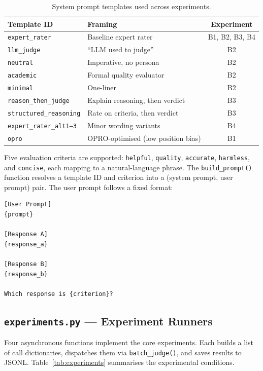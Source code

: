 \documentclass[11pt,a4paper]{article}
\begin{document}
\begin{table}[htbp]
\centering
\small
\caption{System prompt templates used across experiments.}
\label{tab:templates}
\begin{tabular}{@{}llc@{}}
  \toprule
  \textbf{Template ID} & \textbf{Framing} & \textbf{Experiment} \\
  \midrule
  \texttt{expert\_rater}  & Baseline expert rater   & B1, B2, B3, B4 \\
  \texttt{llm\_judge}     & ``LLM used to judge''   & B2 \\
  \texttt{neutral}        & Imperative, no persona  & B2 \\
  \texttt{academic}       & Formal quality evaluator & B2 \\
  \texttt{minimal}        & One-liner               & B2 \\
  \texttt{reason\_then\_judge} & Explain reasoning, then verdict & B3 \\
  \texttt{structured\_reasoning} & Rate on criteria, then verdict & B3 \\
  \texttt{expert\_rater\_alt1--3} & Minor wording variants & B4 \\
  \texttt{opro} & OPRO-optimised (low position bias) & B1 \\
  \bottomrule
\end{tabular}
\end{table}

Five evaluation criteria are supported: \texttt{helpful}, \texttt{quality},
\texttt{accurate}, \texttt{harmless}, and \texttt{concise}, each mapping to
a natural-language phrase. The \texttt{build\_prompt()} function resolves a
template ID and criterion into a (system prompt, user prompt) pair. The user
prompt follows a fixed format:

\begin{lstlisting}
[User Prompt]
{prompt}

[Response A]
{response_a}

[Response B]
{response_b}

Which response is {criterion}?
\end{lstlisting}


\subsection{\texttt{experiments.py} --- Experiment Runners}

Four asynchronous functions implement the core experiments. Each builds a list
of call dictionaries, dispatches them via \texttt{batch\_judge()}, and saves
results to JSONL. Table~\ref{tab:experiments} summarises the experimental
conditions.
\end{document}
